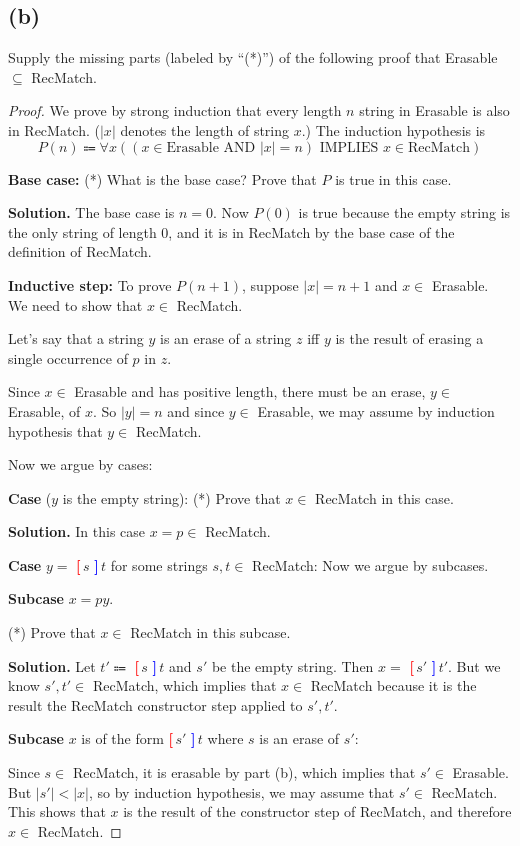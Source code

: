 \documentclass[14pt]{extarticle}
\newcommand{\lbr}{\textcolor{red}{{\bf [\,}}}
\newcommand{\rbr}{\textcolor{blue}{{\bf ]\,}}}
\begin{document}
\subsection{(b)}
Supply the missing parts (labeled by “(*)”) of the following proof that Erasable $\subseteq$ RecMatch.
\begin{proof}
We prove by strong induction that every length $n$ string in Erasable is also in RecMatch. ($|x|$ denotes the length of string $x$.) The induction hypothesis is
$$
P(n) \Coloneqq \forall x((x \in \text{Erasable AND } |x| = n) \text{ IMPLIES } x \in \text{RecMatch})
$$

{\bf Base case:}
(*) What is the base case? Prove that $P$ is true in this case.

{\bf Solution.} The base case is $n = 0$. Now $P (0)$ is true because the empty string is the only string of length 0, and it is in RecMatch by the base case of the definition of RecMatch.

{\bf Inductive step:} To prove $P(n + 1)$, suppose $|x| = n + 1$ and $x \in$ Erasable. We need to show that $x \in$ RecMatch.

Let’s say that a string $y$ is an erase of a string $z$ iff $y$ is the result of erasing a single occurrence of $p$ in $z$.

Since $x \in$ Erasable and has positive length, there must be an erase, $y \in$ Erasable, of $x$. So $|y| = n$ and since $y \in$ Erasable, we may assume by induction hypothesis that $y \in$ RecMatch.

Now we argue by cases:

{\bf Case} ($y$ is the empty string):
(*) Prove that $x \in$ RecMatch in this case.

{\bf Solution.} In this case $x = p \in$ RecMatch.

{\bf Case} $y =$ \lbr $s$ \rbr $t$ for some strings $s, t \in$ RecMatch: Now we argue by subcases.

{\bf Subcase} $x = py$.

(*) Prove that $x \in$ RecMatch in this subcase.

{\bf Solution.} Let $t' \Coloneqq$ \lbr $s$ \rbr $t$ and $s'$ be the empty string. Then $x =$ \lbr $s'$ \rbr $t'$. But we know
$s', t' \in$ RecMatch, which implies that $x \in$ RecMatch because it is the result the RecMatch constructor step applied to $s', t'$.

{\bf Subcase} $x$ is of the form \lbr $s'$ \rbr $t$ where $s$ is an erase of $s'$:

Since $s \in$ RecMatch, it is erasable by part (b), which implies that $s' \in$ Erasable. But $|s'| < |x|$, so by induction hypothesis, we may assume that $s' \in$ RecMatch. This shows that $x$ is the result of the constructor step of RecMatch, and therefore $x \in$ RecMatch.


\end{proof}
\end{document}
